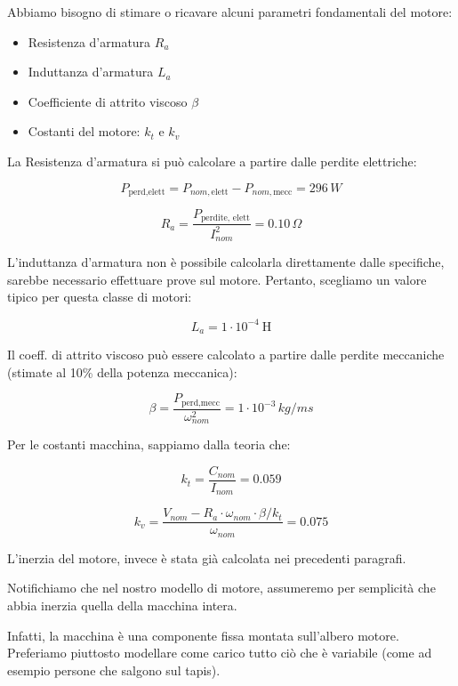 \documentclass[a4paper,12pt]{article}
\begin{document}
Abbiamo bisogno di stimare o ricavare alcuni parametri fondamentali del motore:

\begin{itemize}
    \item Resistenza d'armatura \( R_a \)
    \item Induttanza d'armatura \( L_a \)
    \item Coefficiente di attrito viscoso \( \beta \)
    \item Costanti del motore: \( k_t \) e \( k_v \)
\end{itemize}

\vspace{0.5cm}
La Resistenza d'armatura si può calcolare a partire dalle perdite elettriche:

\[
    P_{\text{perd,elett}} = P_{nom, \text{elett}} - P_{nom, \text{mecc}} = 296\,W
\]

\[
    R_a = \frac{P_{\text{perdite, elett}}}{I_{nom}^2}=0.10\,\Omega
\]
\vspace{0.5cm}

L'induttanza d'armatura non è possibile calcolarla direttamente dalle specifiche, sarebbe necessario effettuare prove sul motore. Pertanto, scegliamo un valore tipico per questa classe di motori:

\[
    L_a = 1 \cdot 10^{-4} \ \text{H}
\]

\vspace{0.5cm}

Il coeff. di attrito viscoso può essere calcolato a partire dalle perdite meccaniche (stimate al 10\% della potenza meccanica):

\[
    \beta = \frac{P_{\text{perd,mecc}}}{\omega_{nom}^2}=1 \cdot 10^{-3}\,kg/ms
\]

\vspace{0.5cm}
Per le costanti macchina, sappiamo dalla teoria che:

\[
    k_t = \frac{C_{nom}}{I_{nom}}=0.059
\]

\[
    k_v = \frac{V_{nom} - R_a \cdot \omega_{nom} \cdot \beta / k_t}{\omega_{nom}}=0.075
\]

\vspace{0.5cm}
L'inerzia del motore, invece è stata già calcolata nei precedenti paragrafi.

Notifichiamo che nel nostro modello di motore, assumeremo per semplicità che abbia inerzia quella della macchina intera.

Infatti, la macchina è una componente fissa montata sull'albero motore. Preferiamo piuttosto modellare come carico tutto ciò che è variabile (come ad esempio persone che salgono sul tapis).
\end{document}
